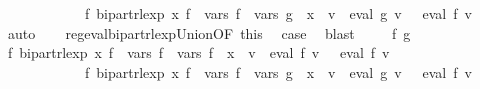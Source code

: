 \begin{isabellebody}
\ \ \ \ \ \ \ \ \ \ \ \ {\isachardoublequoteopen}{\isasymexists}f{\isacharprime}{\kern0pt}{\isachardot}{\kern0pt}\ bipart{\isacharunderscore}{\kern0pt}rlexp\ x\ f{\isacharprime}{\kern0pt}\ {\isasymand}\ vars\ f{\isacharprime}{\kern0pt}\ {\isacharequal}{\kern0pt}\ vars\ g\ {\isasymunion}\ {\isacharbraceleft}{\kern0pt}x{\isacharbraceright}{\kern0pt}\ {\isasymand}\ {\isacharparenleft}{\kern0pt}{\isasymforall}v{\isachardot}{\kern0pt}\ {\isasymPsi}\ {\isacharparenleft}{\kern0pt}eval\ g\ v{\isacharparenright}{\kern0pt}\ {\isacharequal}{\kern0pt}\ {\isasymPsi}\ {\isacharparenleft}{\kern0pt}eval\ f{\isacharprime}{\kern0pt}\ v{\isacharparenright}{\kern0pt}{\isacharparenright}{\kern0pt}{\isachardoublequoteclose}\isanewline
\ \ \ \ \isamarkupfalse%
\ auto\isanewline
\ \ \isamarkupfalse%
\ reg{\isacharunderscore}{\kern0pt}eval{\isacharunderscore}{\kern0pt}bipart{\isacharunderscore}{\kern0pt}rlexp{\isacharunderscore}{\kern0pt}Union{\isacharbrackleft}{\kern0pt}OF\ this{\isacharbrackright}{\kern0pt}\ \isamarkupfalse%
\ {\isacharquery}{\kern0pt}case\ \isamarkupfalse%
\ blast\isanewline
{}\isamarkupfalse%
\isanewline
\ \ \isamarkupfalse%
\ {\isacharparenleft}{\kern0pt}{}\ f\ g{\isacharparenright}{\kern0pt}\isanewline
\ \ \isamarkupfalse%
\ \isamarkupfalse%
\ {\isachardoublequoteopen}{\isasymexists}f{\isacharprime}{\kern0pt}{\isachardot}{\kern0pt}\ bipart{\isacharunderscore}{\kern0pt}rlexp\ x\ f{\isacharprime}{\kern0pt}\ {\isasymand}\ vars\ f{\isacharprime}{\kern0pt}\ {\isacharequal}{\kern0pt}\ vars\ f\ {\isasymunion}\ {\isacharbraceleft}{\kern0pt}x{\isacharbraceright}{\kern0pt}\ {\isasymand}\ {\isacharparenleft}{\kern0pt}{\isasymforall}v{\isachardot}{\kern0pt}\ {\isasymPsi}\ {\isacharparenleft}{\kern0pt}eval\ f\ v{\isacharparenright}{\kern0pt}\ {\isacharequal}{\kern0pt}\ {\isasymPsi}\ {\isacharparenleft}{\kern0pt}eval\ f{\isacharprime}{\kern0pt}\ v{\isacharparenright}{\kern0pt}{\isacharparenright}{\kern0pt}{\isachardoublequoteclose}\isanewline
\ \ \ \ \ \ \ \ \ \ \ \ {\isachardoublequoteopen}{\isasymexists}f{\isacharprime}{\kern0pt}{\isachardot}{\kern0pt}\ bipart{\isacharunderscore}{\kern0pt}rlexp\ x\ f{\isacharprime}{\kern0pt}\ {\isasymand}\ vars\ f{\isacharprime}{\kern0pt}\ {\isacharequal}{\kern0pt}\ vars\ g\ {\isasymunion}\ {\isacharbraceleft}{\kern0pt}x{\isacharbraceright}{\kern0pt}\ {\isasymand}\ {\isacharparenleft}{\kern0pt}{\isasymforall}v{\isachardot}{\kern0pt}\ {\isasymPsi}\ {\isacharparenleft}{\kern0pt}eval\ g\ v{\isacharparenright}{\kern0pt}\ {\isacharequal}{\kern0pt}\ {\isasymPsi}\ {\isacharparenleft}{\kern0pt}eval\ f{\isacharprime}{\kern0pt}\ v{\isacharparenright}{\kern0pt}{\isacharparenright}{\kern0pt}{\isachardoublequoteclose}\isanewline

\end{isabellebody}
